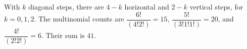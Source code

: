 With $k$ diagonal steps, there are $4-k$ horizontal and $2-k$ vertical steps, for $k=0,1,2$. The multinomial counts are $\dfrac{6!}{(4!2!)}=15$, $\dfrac{5!}{(3!1!1!)}=20$, and $\dfrac{4!}{(2!2!)}=6$. Their sum is $\boxed{41}$.
